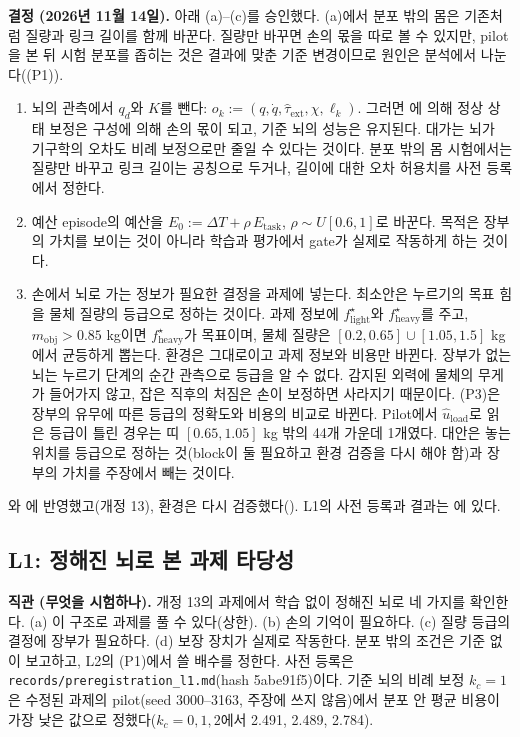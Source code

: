 \documentclass[11pt]{article}\usepackage[margin=1in]{geometry}\usepackage{amsmath,amssymb,amsthm,mathtools}\usepackage{graphicx}\graphicspath{{figures/}{../figures/}{figs/}{./}}\usepackage{enumitem}\usepackage{hyperref}\usepackage{cleveref}\usepackage{tikz}\usetikzlibrary{arrows.meta,positioning,calc,shapes.geometric}\usepackage{float}\usepackage{rotating}\usepackage[most]{tcolorbox}\usepackage{kotex}\usepackage{booktabs}\usepackage{longtable}\emergencystretch=1.6em\tolerance=2000 \crefname{assumption}{Assumption}{Assumptions}\Crefname{assumption}{Assumption}{Assumptions}\crefname{definition}{Definition}{Definitions}\Crefname{definition}{Definition}{Definitions}\crefname{proposition}{Proposition}{Propositions}\Crefname{proposition}{Proposition}{Propositions}\crefname{fact}{Fact}{Facts}\Crefname{fact}{Fact}{Facts} \newtheorem{assumption}{Assumption}\newtheorem{definition}{Definition}\newtheorem{lemma}{Lemma}\newtheorem{proposition}{Proposition}\newtheorem{theorem}{Theorem}\newtheorem{corollary}{Corollary}\newtheorem{fact}{Fact}\theoremstyle{remark}\newtheorem{remark}{Remark} \newcommand{\R}{\mathbb{R}}\newcommand{\xb}{\bar x}\newcommand{\Ab}{\bar A}\newcommand{\By}{\bar B_y}\newcommand{\U}{\mathcal U}\newcommand{\Z}{\mathcal Z}
\begin{document}
\textbf{결정 (2026년 11월 14일).} 아래 (a)--(c)를 승인했다. (a)에서 분포 밖의 몸은 기존처럼 질량과 링크 길이를 함께 바꾼다. 질량만 바꾸면 손의 몫을 따로 볼 수 있지만, pilot을 본 뒤 시험 분포를 좁히는 것은 결과에 맞춘 기준 변경이므로 원인은 분석에서 나눈다((P1)).
\begin{enumerate}[label=(\alph*)]
\item 뇌의 관측에서 $q_d$와 $K$를 뺀다: $o_k:=(q,\dot q,\hat\tau_{\mathrm{ext}},\chi,\ell_k)$. 그러면 에 의해 정상 상태 보정은 구성에 의해 손의 몫이 되고, 기준 뇌의 성능은 유지된다. 대가는 뇌가 기구학의 오차도 비례 보정으로만 줄일 수 있다는 것이다. 분포 밖의 몸 시험에서는 질량만 바꾸고 링크 길이는 공칭으로 두거나, 길이에 대한 오차 허용치를 사전 등록에서 정한다.
\item 예산 episode의 예산을 $E_0:=\Delta T+\rho\,E_{\mathrm{task}}$, $\rho\sim U[0.6,1]$로 바꾼다. 목적은 장부의 가치를 보이는 것이 아니라 학습과 평가에서 gate가 실제로 작동하게 하는 것이다.
\item 손에서 뇌로 가는 정보가 필요한 결정을 과제에 넣는다. 최소안은 누르기의 목표 힘을 물체 질량의 등급으로 정하는 것이다. 과제 정보에 $f^\star_{\mathrm{light}}$와 $f^\star_{\mathrm{heavy}}$를 주고, $m_{\mathrm{obj}}>0.85$ kg이면 $f^\star_{\mathrm{heavy}}$가 목표이며, 물체 질량은 $[0.2,0.65]\cup[1.05,1.5]$ kg에서 균등하게 뽑는다. 환경은 그대로이고 과제 정보와 비용만 바뀐다. 장부가 없는 뇌는 누르기 단계의 순간 관측으로 등급을 알 수 없다. 감지된 외력에 물체의 무게가 들어가지 않고, 잡은 직후의 처짐은 손이 보정하면 사라지기 때문이다. (P3)은 장부의 유무에 따른 등급의 정확도와 비용의 비교로 바뀐다. Pilot에서 $\hat u_{\mathrm{load}}$로 읽은 등급이 틀린 경우는 띠 $[0.65,1.05]$ kg 밖의 44개 가운데 1개였다. 대안은 놓는 위치를 등급으로 정하는 것(block이 둘 필요하고 환경 검증을 다시 해야 함)과 장부의 가치를 주장에서 빼는 것이다.
\end{enumerate}
와 에 반영했고(개정 13), 환경은 다시 검증했다(). L1의 사전 등록과 결과는 에 있다.

\subsection{L1: 정해진 뇌로 본 과제 타당성}
\label{sec:l1}

\textbf{직관 (무엇을 시험하나).} 개정 13의 과제에서 학습 없이 정해진 뇌로 네 가지를 확인한다. (a) 이 구조로 과제를 풀 수 있다(상한). (b) 손의 기억이 필요하다. (c) 질량 등급의 결정에 장부가 필요하다. (d) 보장 장치가 실제로 작동한다. 분포 밖의 조건은 기준 없이 보고하고, L2의 (P1)에서 쓸 배수를 정한다. 사전 등록은 \texttt{records/preregistration\_l1.md}(hash 5abe91f5)이다. 기준 뇌의 비례 보정 $k_c=1$은 수정된 과제의 pilot(seed 3000--3163, 주장에 쓰지 않음)에서 분포 안 평균 비용이 가장 낮은 값으로 정했다($k_c=0,1,2$에서 2.491, 2.489, 2.784).
\end{document}
